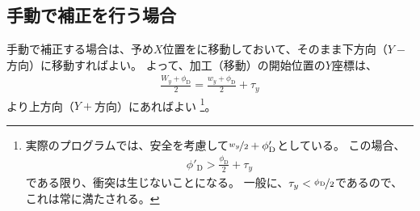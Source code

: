 \subsection{手動で補正を行う場合}
手動で補正する場合は、予め$X$位置をに移動しておいて、そのまま下方向（$Y-$方向）に移動すればよい。
よって、加工（移動）の開始位置の$Y$座標は、
\begin{align*}
  \frac{W_y+\phi_\mathrm D}2 = \frac{w_y+\phi_\mathrm D}2+\tau_y
\end{align*}
より上方向（$Y+$方向）にあればよい%
\footnote{実際のプログラムでは、安全を考慮して$\nicefrac{w_y}2+\phi'_\mathrm D$としている。
この場合、
\begin{align*}
  \phi'_\mathrm D > \frac{\phi_\mathrm D}2+\tau_y
\end{align*}
である限り、衝突は生じないことになる。
一般に、$\tau_y < \nicefrac{\phi_\mathrm D}2$であるので、これは常に満たされる。}。

